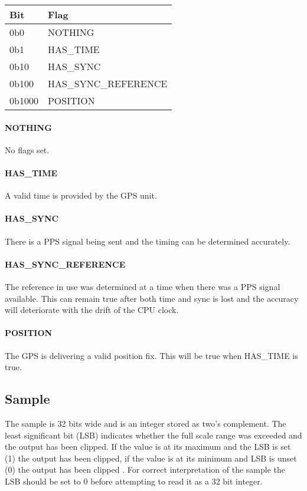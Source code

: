 \documentclass[a4paper]{article}
\begin{document}
\begin{multicols}{2}
    \begin{tabular}{|l|l|}
      \hline
      \bfseries Bit & \bfseries Flag \\ \hline
       0b0    &   NOTHING \\ \hline
       0b1    &   HAS\_TIME    \\ \hline
       0b10   &   HAS\_SYNC    \\ \hline
       0b100  &   HAS\_SYNC\_REFERENCE \\ \hline
       0b1000 &   POSITION \\ \hline
    \end{tabular}
    \label{tab:status_flags}

    \paragraph{NOTHING} No flags set.

    \paragraph{HAS\_TIME} A valid time is provided by the GPS
    unit.
    \paragraph{HAS\_SYNC} There is a PPS signal being sent and the
    timing can be determined accurately.

    \paragraph{HAS\_SYNC\_REFERENCE} The reference in use was
    determined at a time when there was a PPS signal available. This can
    remain true after both time and sync is lost and the accuracy will
    deteriorate with the drift of the CPU clock.

    \paragraph{POSITION} The GPS is delivering a valid
    position fix. This will be true when HAS\_TIME is true.

    \subsection{Sample} The sample is 32 bits wide and is an integer
    stored as two's complement. The least significant bit (LSB)
    indicates whether the full scale range was exceeded and the output
    has been clipped. If the value is at its maximum and the LSB is set
    (1) the output has been clipped, if the value is at its minimum and
    LSB is unset (0) the output has been clipped \cite{ads1282_ds}. For
    correct interpretation of the sample the LSB should be set to 0
    before attempting to read it as a 32 bit integer.


\end{multicols}
\end{document}
